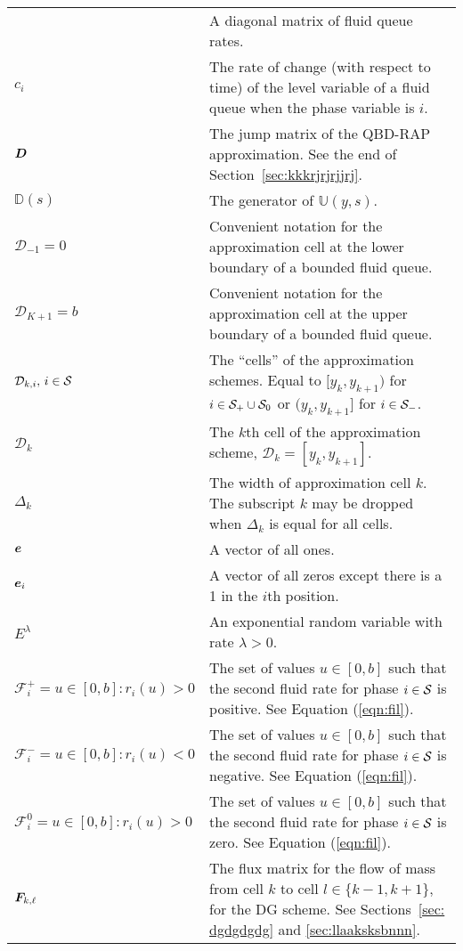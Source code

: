 \begin{longtable}{p{}p{}}
      & A diagonal matrix of fluid queue rates. \\
  \(c_i\) 
      & The rate of change (with respect to time) of the level variable of a fluid queue when the phase variable is \(i\). \\ 
  \(\boldsymbol D\) 
      & The jump matrix of the QBD-RAP approximation. See the end of Section~\ref{sec:kkkrjrjrjjrj}. \\
  \(\mathbb D(s)\)  
      & The generator of \(\mathbb U(y,s)\). \\ 
  \(\mathcal D_{-1} = {0}\)
      & Convenient notation for the approximation cell at the lower boundary of a bounded fluid queue. \\
  \(\mathcal D_{K+1} = {b}\)
      & Convenient notation for the approximation cell at the upper boundary of a bounded fluid queue. \\
  \(\mathcal D_{k,i},\, i\in\mathcal{S}\) 
      & The ``cells'' of the approximation schemes. Equal to \([y_k,y_{k+1})\) for \(i\in\mathcal{S}_+\cup\mathcal{S}_0\) or \((y_k,y_{k+1}]\) for \(i\in\mathcal{S}_-\). \\
  \(\mathcal D_k\) 
      & The \(k\)th cell of the approximation scheme, \(\mathcal D_k=[y_k,y_{k+1}]\). \\
  \(\Delta_k\)
      & The width of approximation cell \(k\). The subscript \(k\) may be dropped when \(\Delta_k\) is equal for all cells. \\ 
  \(\boldsymbol e\) 
      & A vector of all ones. \\
  \(\boldsymbol e_i\) 
      & A vector of all zeros except there is a 1 in the \(i\)th position. \\ 
  \(E^\lambda\) 
      & An exponential random variable with rate \(\lambda>0\). \\
  \(\mathcal F_i^+={u\in[0,b]: r_i(u)>0}\)
      & The set of values \(u\in[0,b]\) such that the second fluid rate for phase \(i\in\mathcal{S}\) is positive. See Equation (\ref{eqn:fil}). \\
  \(\mathcal F_i^-={u\in[0,b]: r_i(u)<0}\)
      & The set of values \(u\in[0,b]\) such that the second fluid rate for phase \(i\in\mathcal{S}\) is negative. See Equation (\ref{eqn:fil}). \\
  \(\mathcal F_i^0={u\in[0,b]: r_i(u)>0}\)
      & The set of values \(u\in[0,b]\) such that the second fluid rate for phase \(i\in\mathcal{S}\) is zero. See Equation (\ref{eqn:fil}). \\
  \(\boldsymbol F_{k,\ell}\) 
      & The flux matrix for the flow of mass from cell \(k\) to cell \(l\in\{k-1,k+1\}\), for the DG scheme. See Sections~\ref{sec: dgdgdgdg} and \ref{sec:llaaksksbnnn}. \\ 

\end{longtable}
